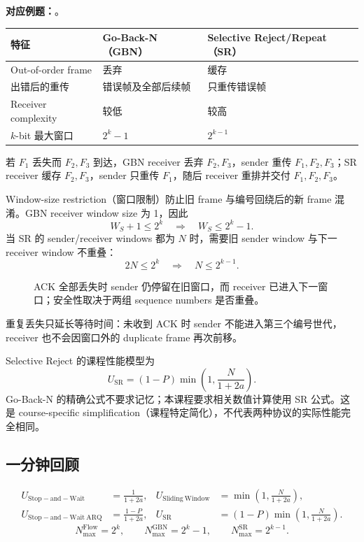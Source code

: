 \textbf{对应例题：}。


\begin{center}
\small
\begin{tabularx}{\textwidth}{@{}>{\raggedright\arraybackslash}p{3.4cm}XX@{}}
  \toprule
  特征 & Go-Back-N（GBN） & Selective Reject/Repeat（SR） \\
  \midrule
  Out-of-order frame & 丢弃 & 缓存 \\
  出错后的重传 & 错误帧及全部后续帧 & 只重传错误帧 \\
  Receiver complexity & 较低 & 较高 \\
  $k$-bit 最大窗口 & $2^k-1$ & $2^{k-1}$ \\
  \bottomrule
\end{tabularx}
\end{center}

若 $F_1$ 丢失而 $F_2,F_3$ 到达，GBN receiver 丢弃 $F_2,F_3$，sender 重传 $F_1,F_2,F_3$；SR receiver 缓存 $F_2,F_3$，sender 只重传 $F_1$，随后 receiver 重排并交付 $F_1,F_2,F_3$。

Window-size restriction（窗口限制）防止旧 frame 与编号回绕后的新 frame 混淆。GBN receiver window size 为 1，因此
\[
  W_S+1\leq 2^k
  \quad\Longrightarrow\quad
  \boxed{W_S\leq 2^k-1}.
\]
当 SR 的 sender/receiver windows 都为 $N$ 时，需要旧 sender window 与下一 receiver window 不重叠：
\[
  2N\leq 2^k
  \quad\Longrightarrow\quad
  \boxed{N\leq 2^{k-1}}.
\]

\begin{figure}[htbp]
  \centering
  \resizebox{0.98\textwidth}{!}{}
  \caption{ACK 全部丢失时 sender 仍停留在旧窗口，而 receiver 已进入下一窗口；安全性取决于两组 sequence numbers 是否重叠。}
  \label{fig:sc2008-l02-window-ambiguity}
\end{figure}

重复丢失只延长等待时间：未收到 ACK 时 sender 不能进入第三个编号世代，receiver 也不会因窗口外的 duplicate frame 再次前移。

Selective Reject 的课程性能模型为
\[
  \boxed{U_{\mathrm{SR}}
    =(1-P)\min\!\left(1,\frac{N}{1+2a}\right)}.
\]
Go-Back-N 的精确公式不要求记忆；本课程要求相关数值计算使用 SR 公式。这是 course-specific simplification（课程特定简化），不代表两种协议的实际性能完全相同。

\subsection{一分钟回顾}

\[
\begin{aligned}
  U_{\mathrm{Stop-and-Wait}}&=\frac{1}{1+2a},
  &U_{\mathrm{Sliding\ Window}}&=\min\!\left(1,\frac{N}{1+2a}\right),\\
  U_{\mathrm{Stop-and-Wait\ ARQ}}&=\frac{1-P}{1+2a},
  &U_{\mathrm{SR}}&=(1-P)\min\!\left(1,\frac{N}{1+2a}\right).
\end{aligned}
\]
\[
  \boxed{N_{\max}^{\mathrm{Flow}}=2^k,\qquad
  N_{\max}^{\mathrm{GBN}}=2^k-1,\qquad
  N_{\max}^{\mathrm{SR}}=2^{k-1}}.
\]
